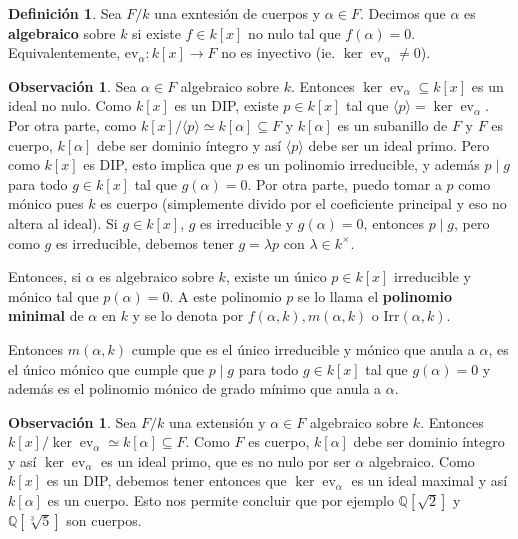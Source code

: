 \documentclass[12pt]{book}
\theoremstyle{definition}
\newtheorem{obs}[teo]{Observación}
\newtheorem{defn}[teo]{Definición}
\newcommand{\QQ}{\mathbb{Q}}
\DeclareMathOperator{\ev}{ev}
\begin{document}
\begin{defn}
Sea $F/k$ una exntesión de cuerpos y $\alpha\in F$. Decimos que $\alpha$ es \textbf{algebraico} sobre $k$ si existe $f\in k[x]$ no nulo tal que $f(\alpha)=0$. Equivalentemente, $\mathrm{ev}_\alpha:k[x]\to F$ no es inyectivo (ie. $\ker \ev_\alpha \neq 0$).
\end{defn}

\begin{obs}
Sea $\alpha\in F$ algebraico sobre $k$. Entonces $\ker\ev_\alpha\subseteq k[x]$ es un ideal no nulo. Como $k[x]$ es un DIP, existe $p\in k[x]$ tal que $\langle p\rangle = \ker\ev_\alpha$. Por otra parte, como $k[x]/\langle p\rangle \simeq k[\alpha]\subseteq F$ y $k[\alpha]$ es un subanillo de $F$ y $F$ es cuerpo, $k[\alpha]$ debe ser dominio íntegro y así $\langle p\rangle$ debe ser un ideal primo. Pero como $k[x]$ es DIP, esto implica que $p$ es un polinomio irreducible, y además $p\mid g$ para todo $g\in k[x]$ tal que $g(\alpha)=0$. Por otra parte, puedo tomar a $p$ como mónico pues $k$ es cuerpo (simplemente divido por el coeficiente principal y eso no altera al ideal). Si $g\in k[x]$, $g$ es irreducible y $g(\alpha)=0$, entonces $p\mid g$, pero como $g$ es irreducible, debemos tener $g=\lambda p$ con $\lambda \in k^\times$.

Entonces, si $\alpha$ es algebraico sobre $k$, existe un único $p\in k[x]$ irreducible y mónico tal que $p(\alpha)=0$. A este polinomio $p$ se lo llama el \textbf{polinomio minimal} de $\alpha$ en $k$ y se lo denota por $f(\alpha,k), m(\alpha,k)$ o $\mathrm{Irr}(\alpha,k)$.

Entonces $m(\alpha,k)$ cumple que es el único irreducible y mónico que anula a $\alpha$, es el único mónico que cumple que $p\mid g$ para todo $g\in k[x]$ tal que $g(\alpha)=0$ y además es el polinomio mónico de grado mínimo que anula a $\alpha$.
\end{obs}

\begin{obs}
Sea $F/k$ una extensión y $\alpha\in F$ algebraico sobre $k$. Entonces $k[x]/\ker \ev_\alpha \simeq k[\alpha]\subseteq F$. Como $F$ es cuerpo, $k[\alpha]$ debe ser dominio íntegro y así $\ker\ev_\alpha$ es un ideal primo, que es no nulo por ser $\alpha$ algebraico. Como $k[x]$ es un DIP, debemos tener entonces que $\ker\ev_\alpha$ es un ideal maximal y así $k[\alpha]$ es un cuerpo. Esto nos permite concluir que por ejemplo $\QQ[\sqrt{2}]$ y $\QQ[\sqrt[3]{5}]$ son cuerpos.
\end{obs}
\end{document}
